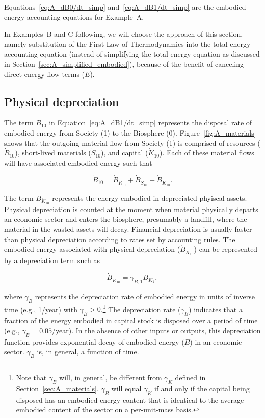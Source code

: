 \noindent{}Equations~\ref{eq:A_dB0/dt_simp} and~\ref{eq:A_dB1/dt_simp} are 
the embodied energy accounting equations for Example~A.

In Examples~B and C following, we will choose the approach of 
this section, namely substitution of the 
First Law of Thermodynamics into the total energy accounting equation
(instead of simplifying the total energy equation 
as discussed in Section~\ref{sec:A_simplified_embodied}),
because of the benefit of canceling direct energy flow terms ($\dot{E}$). 


\subsection{Physical depreciation}

The term $\dot{B}_{10}$ in Equation~\ref{eq:A_dB1/dt_simp}
represents the disposal rate 
of embodied energy from Society (1) to the Biosphere (0). 
Figure~\ref{fig:A_materials} shows that the outgoing material flow
from Society (1) is comprised of 
resources ($\dot{R}_{10}$),
short-lived materials ($\dot{S}_{10}$), and 
capital ($\dot{K}_{10}$). 
Each of these material flows will have associated embodied energy such that

\begin{equation} \label{eq:A-depreciation-of-B}
	\dot{B}_{10}
	= \dot{B}_{\dot{R}_{10}}
	+ \dot{B}_{\dot{S}_{10}}
	+ \dot{B}_{\dot{K}_{10}}.
\end{equation}

The term $\dot{B}_{\dot{K}_{10}}$ represents the energy embodied
in depreciated phyiscal assets.
Physical depreciation 
is counted at the moment when material physically departs an economic sector 
and enters the biosphere, presumably a landfill, 
where the material in the wasted assets will decay.
Financial depreciation
is usually faster than physical depreciation
according to rates set by accounting rules.
The embodied energy associated with physical depreciation ($\dot{B}_{\dot{K}_{10}}$)
can be represented by a depreciation term such as

\begin{equation} \label{eq:depreciation_term_defined}
	\dot{B}_{\dot{K}_{10}} 
	= \gamma_{B,1} B_{K_{1}},
\end{equation}

\noindent{}where $\gamma_{B}$ represents the depreciation rate 
of embodied energy in units of inverse time (e.g., 1/year) 
with $\gamma_{B} > 0$.\footnote{Note that $\gamma_B$ will, in general,
be different from $\gamma_{K}$ defined in Section~\ref{sec:A_materials}.
$\gamma_{B}$ will equal $\gamma_{K}$ if and only if 
the capital being disposed has an embodied energy content that is 
identical to the average embodied content of the sector on a per-unit-mass basis.}
The depreciation rate ($\gamma_{B}$) indicates that 
a fraction of the energy embodied in capital stock
is disposed over a period of time (e.g., $\gamma_{B} = 0.05$/year). 
In the absence of other inputs or outputs, 
this depreciation function provides exponential decay 
of embodied energy ($B$) in an economic sector. 
$\gamma_{B}$ is, in general, a function of time.

